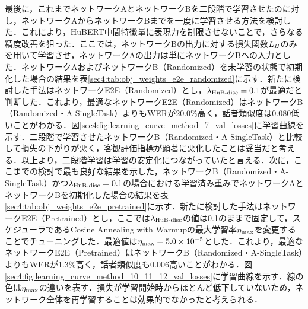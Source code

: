 最後に，これまでネットワークAとネットワークBを二段階で学習させたのに対し，ネットワークAからネットワークBまでを一度に学習させる方法を検討した．これにより，HuBERT中間特徴量に表現力を制限させないことで，さらなる精度改善を狙った．ここでは，ネットワークBの出力に対する損失関数$L_{B}$のみを用いて学習させ，ネットワークAの出力は単にネットワークBへの入力とした．ネットワークAおよびネットワークB（Randomized）を未学習の状態で初期化した場合の結果を表\ref{sec4:tab:obj_weights_e2e_randomized}に示す．新たに検討した手法はネットワークE2E（Randomized）とし，$\lambda_{\text{HuB-disc}} = 0.1$が最適だと判断した．これより，最適なネットワークE2E（Randomized）はネットワークB（Randomized・A-SingleTask）よりもWERが20.0\%高く，話者類似度は0.080低いことがわかる．図\ref{sec4:fig:learning_curve_method_7_val_losses}に学習曲線を示す．二段階で学習させたネットワークB（Randomized・A-SingleTask）と比較して損失の下がりが悪く，客観評価指標が顕著に悪化したことは妥当だと考える．以上より，二段階学習は学習の安定化につながっていたと言える．次に，ここまでの検討で最も良好な結果を示した，ネットワークB（Randomized・A-SingleTask）かつ$\lambda_{\text{HuB-disc}} = 0.1$の場合における学習済み重みでネットワークAとネットワークBを初期化した場合の結果を表\ref{sec4:tab:obj_weights_e2e_pretrained}に示す．新たに検討した手法はネットワークE2E（Pretrained）とし，ここでは$\lambda_{\text{HuB-disc}}$の値は0.1のままで固定して，スケジューラであるCosine Annealing with Warmupの最大学習率$\eta_{\text{max}}$を変更することでチューニングした．最適値は$\eta_{\text{max}} = 5.0 \times 10^{-5}$とした．これより，最適なネットワークE2E（Pretrained）はネットワークB（Randomized・A-SingleTask）よりもWERが1.3\%高く，話者類似度も0.006高いことがわかる．図\ref{sec4:fig:learning_curve_method_10_11_12_val_losses}に学習曲線を示す．線の色は$\eta_{\text{max}}$の違いを表す．損失が学習開始時からほとんど低下していないため，ネットワーク全体を再学習することは効果的でなかったと考えられる．

